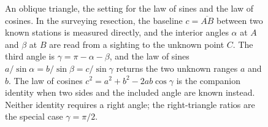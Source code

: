 \begin{figure}[htbp]
\centering
{}
\caption[An oblique triangle for the law of sines]{An oblique triangle, the
setting for the law of sines and the law of cosines. In the surveying
resection, the baseline $c = \overline{AB}$ between two known stations is
measured directly, and the interior angles $\alpha$ at $A$ and $\beta$ at $B$
are read from a sighting to the unknown point $C$. The third angle is
$\gamma = \pi - \alpha - \beta$, and the law of sines
$a/\sin\alpha = b/\sin\beta = c/\sin\gamma$ returns the two unknown ranges
$a$ and $b$. The law of cosines $c^{2} = a^{2} + b^{2} - 2ab\cos\gamma$ is
the companion identity when two sides and the included angle are known
instead. Neither identity requires a right angle; the right-triangle ratios
are the special case $\gamma = \pi/2$.}
\label{fig:vol02ch03:oblique-triangle}
\end{figure}
